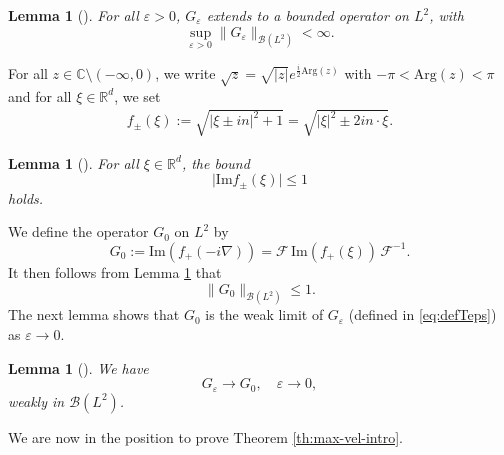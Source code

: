 \documentclass[12pt]{article}
\theoremstyle{plain}
\newtheorem{lemma}[theo]{Lemma}
\newcommand{\Tepsilon}{{G_\varepsilon}}
\newcommand{\Tzero}{{G_0}}
\begin{document}
	
	\begin{lemma}[\cite{BFG2a}]\label{lm:unif-bound}
	    For all $\varepsilon>0$, $\Tepsilon$ extends to a bounded operator on $L^2$, with
	    \begin{equation*}
	        \sup_{\varepsilon>0}\|\Tepsilon\|_{\mathcal{B}(L^2)}<\infty.
	    \end{equation*}
	\end{lemma}


For all $z\in\mathbb{C}\setminus(-\infty,0)$, we write $\sqrt{z}=\sqrt{|z|}e^{\frac{i}{2}\mathrm{Arg}(z)}$ with $-\pi<\mathrm{Arg}(z)<\pi$ and for all $\xi\in\mathbb{R}^d$, we set
	\begin{align}\label{eq:def_fpm}
    f_\pm(\xi):=\sqrt{|\xi\pm in|^2+1}=\sqrt{|\xi|^2\pm 2in\cdot\xi}.
\end{align}


\begin{lemma}[\cite{BFG2a}]\label{lm:bound_fpm}
    For all $\xi\in\mathbb{R}^d$, the bound
    \begin{equation*}
        \big|\mathrm{Im}f_\pm(\xi)\big|\le1
    \end{equation*}
    holds.
\end{lemma}



We define the operator $\Tzero$ on $L^2$ by
\begin{equation}\label{eq:defT0}
    \Tzero := \mathrm{Im}(f_+(-i\nabla)) = \mathcal{F} \, \mathrm{Im}(f_+(\xi)) \,  \mathcal{F}^{-1}.
\end{equation}
It then follows from Lemma \ref{lm:bound_fpm} that
\begin{equation}
    \|\Tzero\|_{\mathcal{B}(L^2)}\le1.\label{eq:borne-T0}
\end{equation}
The next lemma shows that $\Tzero$ is the weak limit of $\Tepsilon$ (defined in \eqref{eq:defTeps}) as $\varepsilon\to0$.



\begin{lemma}[\cite{BFG2a}]\label{lm:strongconv}
We have
\begin{equation*}
    \Tepsilon\to \Tzero, \quad \varepsilon\to0,
\end{equation*}
weakly in $\mathcal{B}(L^2)$.
\end{lemma}



We are now in the position to prove Theorem \ref{th:max-vel-intro}.
\end{document}
